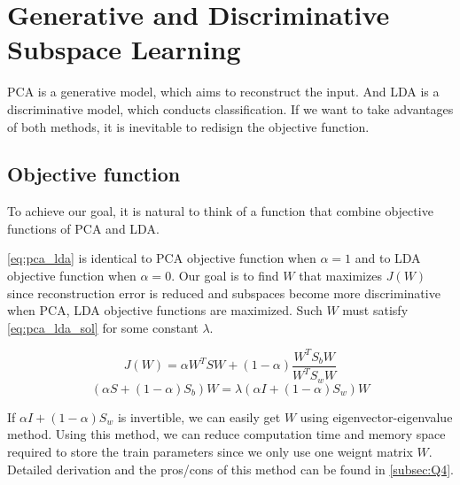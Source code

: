 \section{Generative and Discriminative Subspace Learning}
\label{sec:intro}

PCA is a generative model, which aims to reconstruct the input. And LDA is a discriminative model, which conducts classification. If we want to take advantages of both methods, it is inevitable to redisign the objective function.

\subsection{Objective function}
To achieve our goal, it is natural to think of a function that combine objective functions of PCA and LDA.

\cref{eq:pca_lda} is identical to PCA objective function when $\alpha=1$ and to LDA objective function when $\alpha=0$. Our goal is to find $W$ that maximizes $J(W)$ since reconstruction error is reduced and subspaces become more discriminative when PCA, LDA objective functions are maximized. Such $W$ must satisfy \cref{eq:pca_lda_sol} for some constant $\lambda$.

\vspace{-0.2cm}
\begin{equation}
  J(W) = \alpha W^TSW+(1-\alpha) \frac{W^TS_bW}{W^TS_wW}
  \label{eq:pca_lda}
\end{equation}
\vspace{-0.2cm}
\begin{equation}
  (\alpha S+(1-\alpha)S_b)W = \lambda (\alpha I + (1-\alpha)S_w)W
  \label{eq:pca_lda_sol}
\end{equation}

If $\alpha I + (1-\alpha)S_w$ is invertible, we can easily get $W$ using eigenvector-eigenvalue method. Using this method, we can reduce computation time and memory space required to store the train parameters since we only use one weignt matrix $W$. Detailed derivation and the pros/cons of this method can be found in \cref{subsec:Q4}.
